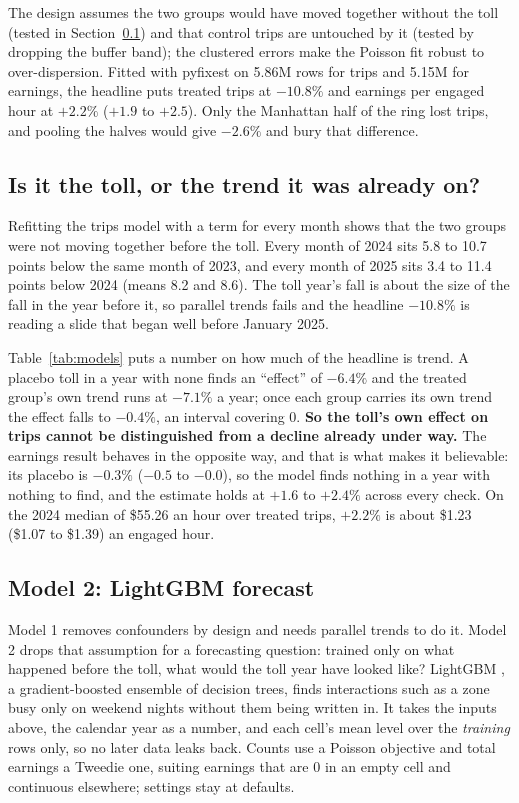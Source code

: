 \documentclass[11pt]{article}
\begin{document}
The design assumes the two groups would have moved together without the toll (tested in Section~\ref{sec:trend}) and that control trips are untouched by it (tested by dropping the buffer band); the clustered errors make the Poisson fit robust to over-dispersion. Fitted with pyfixest \cite{pyfixest} on 5.86M rows for trips and 5.15M for earnings, the headline puts treated trips at $-10.8\%$ and earnings per engaged hour at $+2.2\%$ ($+1.9$ to $+2.5$). Only the Manhattan half of the ring lost trips, and pooling the halves would give $-2.6\%$ and bury that difference.

\subsection{Is it the toll, or the trend it was already on?}
\label{sec:trend}

Refitting the trips model with a term for every month shows that the two groups were not moving together before the toll. Every month of 2024 sits 5.8 to 10.7 points below the same month of 2023, and every month of 2025 sits 3.4 to 11.4 points below 2024 (means 8.2 and 8.6). The toll year's fall is about the size of the fall in the year before it, so parallel trends fails and the headline $-10.8\%$ is reading a slide that began well before January 2025.

Table~\ref{tab:models} puts a number on how much of the headline is trend. A placebo toll in a year with none finds an ``effect'' of $-6.4\%$ and the treated group's own trend runs at $-7.1\%$ a year; once each group carries its own trend the effect falls to $-0.4\%$, an interval covering 0. \textbf{So the toll's own effect on trips cannot be distinguished from a decline already under way.} The earnings result behaves in the opposite way, and that is what makes it believable: its placebo is $-0.3\%$ ($-0.5$ to $-0.0$), so the model finds nothing in a year with nothing to find, and the estimate holds at $+1.6$ to $+2.4\%$ across every check. On the 2024 median of \$55.26 an hour over treated trips, $+2.2\%$ is about \$1.23 (\$1.07 to \$1.39) an engaged hour.

\subsection{Model 2: LightGBM forecast}
\label{sec:model2}
Model 1 removes confounders by design and needs parallel trends to do it. Model 2 drops that assumption for a forecasting question: trained only on what happened before the toll, what would the toll year have looked like? LightGBM \cite{ke2017}, a gradient-boosted ensemble of decision trees, finds interactions such as a zone busy only on weekend nights without them being written in. It takes the inputs above, the calendar year as a number, and each cell's mean level over the \emph{training} rows only, so no later data leaks back. Counts use a Poisson objective and total earnings a Tweedie one, suiting earnings that are 0 in an empty cell and continuous elsewhere; settings stay at defaults.
\end{document}
